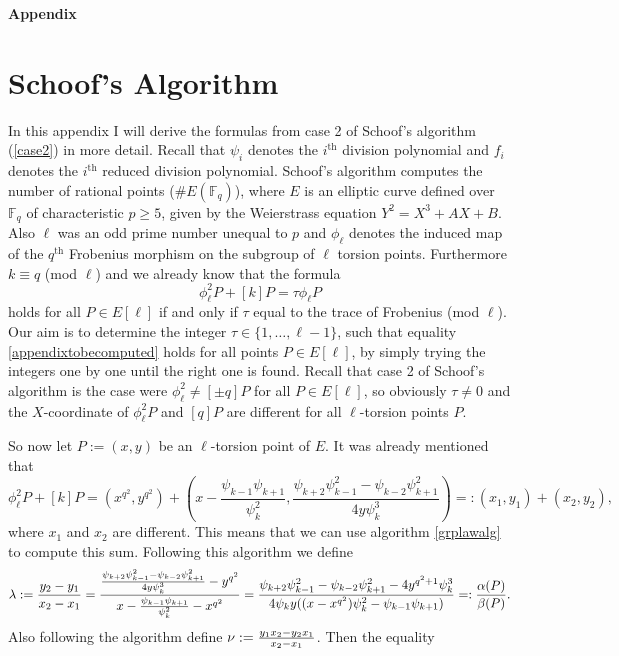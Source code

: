 \documentclass{article}
\numberwithin{equation}{section}
\theoremstyle{definition}
\newcommand{\FF}[1]{{\mathbb F}_{#1}} %
\begin{document}
\appendix
\begin{center}{\LARGE \textbf{Appendix}}\end{center}
\section{Schoof's Algorithm}
In this appendix I will derive the formulas from case 2 of Schoof's algorithm (\ref{case2}) in more detail. Recall that $\psi_i$ denotes the $i^\text{th}$ division polynomial and $f_i$ denotes the $i^\text{th}$ reduced division polynomial. Schoof's algorithm computes the number of rational points ($\#E(\FF{q})$), where $E$ is an elliptic curve defined over $\FF{q}$ of characteristic $p \geq 5$, given by the Weierstrass equation $Y^2=X^3+AX+B$. Also $\ell$ was an odd prime number unequal to $p$ and $\phi_\ell$ denotes the induced map of the $q^\text{th}$ Frobenius morphism on the subgroup of $\ell$ torsion points. Furthermore $k \equiv q$ (mod $\ell$) and we already know that the formula 
\begin{equation}\label{appendixtobecomputed}\phi_\ell^2 P + [k]P = \tau \phi_\ell P\end{equation} 
holds for all $P \in E[\ell]$ if and only if $\tau$ equal to the trace of Frobenius (mod $\ell$). Our aim is to determine the integer $\tau \in \{1,\ldots,\ell-1\}$, such that equality \ref{appendixtobecomputed} holds for all points $P\in E[\ell]$, by simply trying the integers one by one until the right one is found. Recall that case 2 of Schoof's algorithm is the case were $\phi_\ell^2 \neq [\pm q]P$ for all $P\in E[\ell]$, so obviously $\tau \neq 0$ and the $X$-coordinate of $\phi_\ell^2P$ and $[q]P$ are different for all $\ell$-torsion points $P$.\par 
So now let $P:=(x,y)$ be an $\ell$-torsion point of $E$. It was already mentioned that 
$$\phi_\ell^2P+[k]P=(x^{q^2},y^{q^2})+\left ( x-\frac{\psi_{k-1}\psi_{k+1}}{\psi_k^2},\frac{\psi_{k+2}\psi_{k-1}^2 - \psi_{k-2}\psi_{k+1}^2}{4y\psi_k^3}\right)=:(x_1,y_1)+(x_2,y_2),$$
 where $x_1$ and $x_2$ are different. This means that we can use algorithm \ref{grplawalg} to compute this sum. Following this algorithm we define 
$$\lambda:=\frac{y_2-y_1}{x_2-x_1}={\large \frac{\frac{\psi_{k+2}\psi_{k-1}^2-\psi_{k-2}\psi_{k+1}^2}{4y\psi_k^3}-y^{q^2}}{x-\frac{\psi_{k-1}\psi_{k+1}}{\psi_k^2}-x^{q^2}}}=\frac{\psi_{k+2}\psi_{k-1}^2-\psi_{k-2}\psi_{k+1}^2-4y^{q^2+1}\psi_k^3}{4\psi_ky((x-x^{q^2})\psi_k^2-\psi_{k-1}\psi_{k+1})}=:\frac{\alpha(P)}{\beta(P)}.$$
Also following the algorithm define $\nu:={\Large \frac{y_1x_2-y_2x_1}{x_2-x_1}}$. Then the equality 
\end{document}

